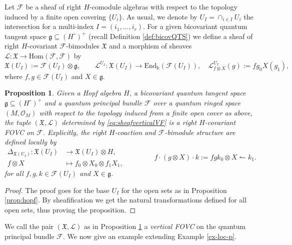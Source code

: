 \documentclass{article}
\newtheorem{proposition}[thm]{Proposition}
\theoremstyle{definition}
\newcommand{\cO}{{\mathcal{O}}}
\newcommand{\Chi}{{\mathfrak{X}}}
\newcommand{\fg}{{\mathfrak{g}}}
\newcommand{\cF}{{\mathcal{F}}}
\begin{document}
Let $\mathcal{F}$ be a sheaf of right $H$-comodule algebras with respect to the topology induced by a finite open covering $\{U_i\}$. As usual, we denote by $U_I=\cap_{i\in I}U_i$ the intersection for a multi-index $I=(i_1,\ldots,i_r)$. For a given bicovariant quantum tangent space $\mathfrak{g}\subseteq (H^\circ)^+$ (recall Definition \ref{def:bicovQTS}) we define a sheaf of right $H$-covariant $\mathcal{F}$-bimodules $\mathfrak{X}$ and a morphism of sheaves $\mathscr{L}\colon\mathfrak{X}\to\mathrm{Hom}(\mathcal{F},\mathcal{F})$ by
\begin{equation}\label{eq:sheafverticalVF}
\Chi(U_I):=\cF(U_I) \otimes \fg, \qquad \mathscr{L}^{U_I}:\Chi(U_I) \to  \mathrm{End}_\Bbbk(\cF(U_I)),
\quad \mathscr{L}^{U_I}_{f \otimes X}(g):=fg_0X(g_1), 
\end{equation}
where $f,g \in \cF(U_I)$ and $X \in \fg$.
\begin{proposition}\label{prop:sheafqpb}
Given a Hopf algebra $H$, a bicovariant quantum tangent space $\mathfrak{g}\subseteq (H^\circ)^+$ and
a quantum principal bundle $\mathcal{F}$ over a quantum ringed space $(M,\cO_M)$
with respect to the topology induced from a finite open cover as above, the tuple $(\mathfrak{X},\mathscr{L})$ determined by \eqref{eq:sheafverticalVF} is a right $H$-covariant FOVC on $\mathcal{F}$. Explicitly, the right $H$-coaction and $\mathcal{F}$-bimodule structure are defined locally by
\begin{equation}
	\begin{split}
		\Delta_{\mathfrak{X}(U_I)}\colon\mathfrak{X}(U_I)&\to\mathfrak{X}(U_I)\otimes H,\\
		f\otimes X&\mapsto f_0\otimes X_0\otimes f_1X_1,
	\end{split}\qquad\qquad f\cdot(g\otimes X)\cdot k:=fgk_0\otimes X\leftharpoonup k_1.
\end{equation}
for all $f,g,k\in\mathcal{F}(U_I)$ and $X\in\mathfrak{g}$.
\end{proposition}
\begin{proof}
The proof goes for the base $U_I$ for the open sets as in Proposition \ref{prop:hopf}.
By sheafification
we get the natural transformations defined for all open sets, thus proving the proposition.
\end{proof}


We call the pair $(\Chi,\mathscr{L})$ as in Proposition \ref{prop:sheafqpb} a \textit{vertical FOVC} on the quantum principal bundle $\cF$.
We now give an example extending Example \ref{ex-loc-p}.
\end{document}

